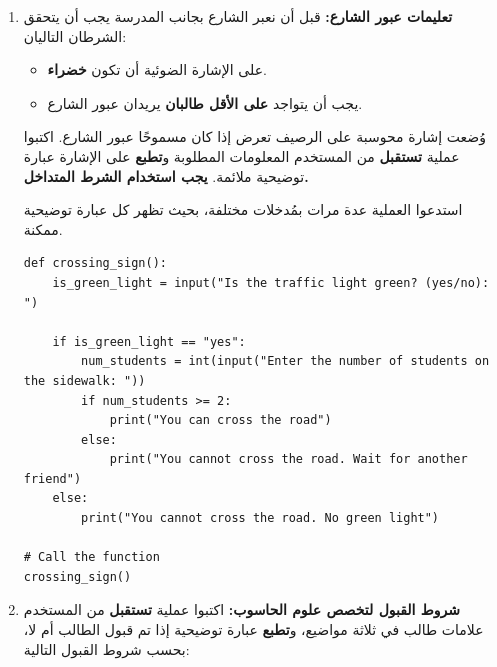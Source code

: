 \documentclass[14pt]{extarticle}
\begin{document}
\begin{enumerate}[resume, label=\textbf{تمرين \arabic*:}, wide=0pt, itemsep=2.2em]
\begin{boxSolution}
\begin{english}
\begin{verbatim}
if number1 >= number2 and number1 >= number3:
    print(number1, "is the largest number.")
elif number2 >= number1 and number2 >= number3:
    print(number2, "is the largest number.")
else:
    print(number3, "is the largest number.")
\end{verbatim}
\end{english}
\end{boxSolution}

\fi
\filbreak

\item \textbf{تعليمات عبور الشارع:} قبل أن نعبر الشارع بجانب المدرسة يجب أن يتحقق الشرطان التاليان:

\begin{itemize}[itemsep=0.3em]
\item على الإشارة الضوئية أن تكون \textbf{خضراء}.
\item يجب أن يتواجد \textbf{على الأقل طالبان} يريدان عبور الشارع.
\end{itemize}

وُضعت إشارة محوسبة على الرصيف تعرض إذا كان مسموحًا عبور الشارع. اكتبوا عملية \textbf{تستقبل} من المستخدم المعلومات المطلوبة و\textbf{تطبع} على الإشارة عبارة توضيحية ملائمة. \textbf{يجب استخدام الشرط المتداخل.}

استدعوا العملية عدة مرات بمُدخلات مختلفة، بحيث تظهر كل عبارة توضيحية ممكنة.

\ifwithsols
\begin{boxSolution}
\begin{english}
\begin{verbatim}
def crossing_sign():
    is_green_light = input("Is the traffic light green? (yes/no): ")

    if is_green_light == "yes":
        num_students = int(input("Enter the number of students on the sidewalk: "))
        if num_students >= 2:
            print("You can cross the road")
        else:
            print("You cannot cross the road. Wait for another friend")
    else:
        print("You cannot cross the road. No green light")

# Call the function
crossing_sign()
\end{verbatim}
\end{english}
\end{boxSolution}

\fi
\filbreak

\item \textbf{شروط القبول لتخصص علوم الحاسوب:} اكتبوا عملية \textbf{تستقبل} من المستخدم علامات طالب في ثلاثة مواضيع، و\textbf{تطبع} عبارة توضيحية إذا تم قبول الطالب أم لا، بحسب شروط القبول التالية:


\end{enumerate}
\end{document}
